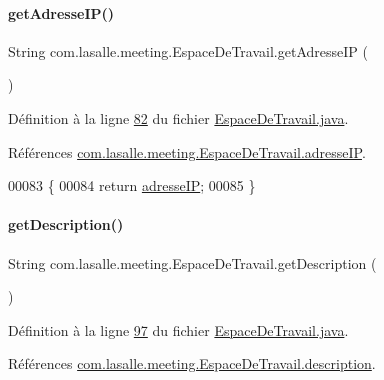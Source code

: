 \paragraph{\texorpdfstring{get\+Adresse\+I\+P()}{getAdresseIP()}}
{\footnotesize\ttfamily String com.\+lasalle.\+meeting.\+Espace\+De\+Travail.\+get\+Adresse\+IP (\begin{DoxyParamCaption}{ }\end{DoxyParamCaption})}



Définition à la ligne \hyperlink{_espace_de_travail_8java_source_l00082}{82} du fichier \hyperlink{_espace_de_travail_8java_source}{Espace\+De\+Travail.\+java}.



Références \hyperlink{_espace_de_travail_8java_source_l00031}{com.\+lasalle.\+meeting.\+Espace\+De\+Travail.\+adresse\+IP}.


\begin{DoxyCode}
00083     \{
00084         \textcolor{keywordflow}{return} \hyperlink{classcom_1_1lasalle_1_1meeting_1_1_espace_de_travail_aa4d9547d0170feeeb49c123e36226b79}{adresseIP};
00085     \}
\end{DoxyCode}
\mbox{\label{classcom_1_1lasalle_1_1meeting_1_1_espace_de_travail_a815ecee3f01117f2d9b1d9441b214907}} 
\paragraph{\texorpdfstring{get\+Description()}{getDescription()}}
{\footnotesize\ttfamily String com.\+lasalle.\+meeting.\+Espace\+De\+Travail.\+get\+Description (\begin{DoxyParamCaption}{ }\end{DoxyParamCaption})}



Définition à la ligne \hyperlink{_espace_de_travail_8java_source_l00097}{97} du fichier \hyperlink{_espace_de_travail_8java_source}{Espace\+De\+Travail.\+java}.



Références \hyperlink{_espace_de_travail_8java_source_l00034}{com.\+lasalle.\+meeting.\+Espace\+De\+Travail.\+description}.



